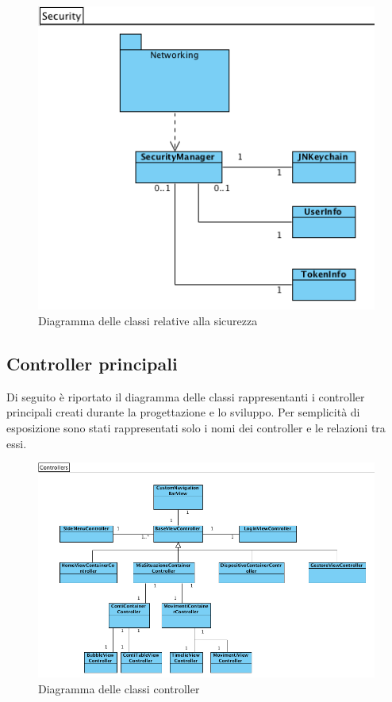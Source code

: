 \begin{figure}[!htbp]
\centering
\includegraphics[scale=0.70]{architettura/securityClass.png}
\caption{Diagramma delle classi relative alla sicurezza}
\end{figure}

\subsection{Controller principali}
Di seguito è riportato il diagramma delle classi rappresentanti i controller principali creati durante la progettazione e lo sviluppo. Per semplicità di esposizione sono stati rappresentati solo i nomi dei controller e le relazioni tra essi.

\newpage

\begin{figure}[!htbp]
\centering
\includegraphics[scale=0.70]{architettura/controllersClass.png}
\caption{Diagramma delle classi controller}
\end{figure}
\begin{landscape}
\end{landscape}

